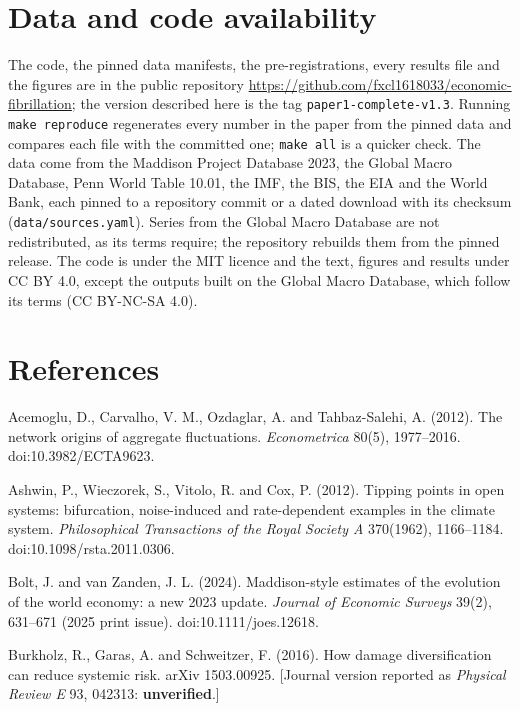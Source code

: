 \documentclass[11pt,a4paper]{article}
\begin{document}
\section{Data and code availability}\label{data-and-code-availability}

The code, the pinned data manifests, the pre-registrations, every results file and the figures are in the public repository \url{https://github.com/fxcl1618033/economic-fibrillation}; the version described here is the tag \texttt{paper1-complete-v1.3}. Running \texttt{make\ reproduce} regenerates every number in the paper from the pinned data and compares each file with the committed one; \texttt{make\ all} is a quicker check. The data come from the Maddison Project Database 2023, the Global Macro Database, Penn World Table 10.01, the IMF, the BIS, the EIA and the World Bank, each pinned to a repository commit or a dated download with its checksum (\texttt{data/sources.yaml}). Series from the Global Macro Database are not redistributed, as its terms require; the repository rebuilds them from the pinned release. The code is under the MIT licence and the text, figures and results under CC BY 4.0, except the outputs built on the Global Macro Database, which follow its terms (CC BY-NC-SA 4.0).

\section{References}\label{references}

Acemoglu, D., Carvalho, V. M., Ozdaglar, A. and Tahbaz-Salehi, A. (2012). The network origins of aggregate fluctuations. \emph{Econometrica} 80(5), 1977–2016. doi:10.3982/ECTA9623.

Ashwin, P., Wieczorek, S., Vitolo, R. and Cox, P. (2012). Tipping points in open systems: bifurcation, noise-induced and rate-dependent examples in the climate system. \emph{Philosophical Transactions of the Royal Society A} 370(1962), 1166–1184. doi:10.1098/rsta.2011.0306.

Bolt, J. and van Zanden, J. L. (2024). Maddison-style estimates of the evolution of the world economy: a new 2023 update. \emph{Journal of Economic Surveys} 39(2), 631–671 (2025 print issue). doi:10.1111/joes.12618.

Burkholz, R., Garas, A. and Schweitzer, F. (2016). How damage diversification can reduce systemic risk. arXiv 1503.00925. {[}Journal version reported as \emph{Physical Review E} 93, 042313: \textbf{unverified}.{]}
\end{document}
